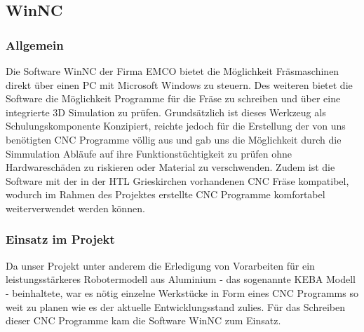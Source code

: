 \subsection{WinNC}
\subsubsection{Allgemein}
Die Software WinNC der Firma EMCO bietet die Möglichkeit Fräsmaschinen direkt über einen PC mit Microsoft Windows zu steuern. Des weiteren bietet die Software die Möglichkeit Programme für die Fräse zu schreiben und über eine integrierte 3D Simulation zu prüfen. Grundsätzlich ist dieses Werkzeug als Schulungskomponente Konzipiert, reichte jedoch für die Erstellung der von uns benötigten CNC Programme völlig aus und gab uns die Möglichkeit durch die Simmulation Abläufe auf ihre Funktionstüchtigkeit zu prüfen ohne Hardwareschäden zu riskieren oder Material zu verschwenden.
Zudem ist die Software mit der in der HTL Grieskirchen vorhandenen CNC Fräse kompatibel, wodurch im Rahmen des Projektes erstellte CNC Programme komfortabel weiterverwendet werden können.

\subsubsection{Einsatz im Projekt}
Da unser Projekt unter anderem die Erledigung von Vorarbeiten für ein leistungsstärkeres Robotermodell aus Aluminium - das sogenannte KEBA Modell - beinhaltete, war es nötig einzelne Werkstücke in Form eines CNC Programms so weit zu planen wie es der aktuelle Entwicklungsstand zulies. Für das Schreiben dieser CNC Programme kam die Software WinNC zum Einsatz.